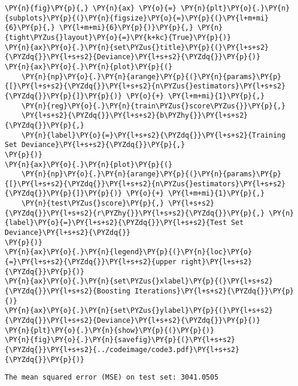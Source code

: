 \begin{Verbatim}[commandchars=\\\{\}]
\PY{n}{fig}\PY{p}{,} \PY{n}{ax} \PY{o}{=} \PY{n}{plt}\PY{o}{.}\PY{n}{subplots}\PY{p}{(}\PY{n}{figsize}\PY{o}{=}\PY{p}{(}\PY{l+m+mi}{6}\PY{p}{,} \PY{l+m+mi}{6}\PY{p}{)}\PY{p}{,} \PY{n}{tight\PYZus{}layout}\PY{o}{=}\PY{k+kc}{True}\PY{p}{)}
\PY{n}{ax}\PY{o}{.}\PY{n}{set\PYZus{}title}\PY{p}{(}\PY{l+s+s2}{\PYZdq{}}\PY{l+s+s2}{Deviance}\PY{l+s+s2}{\PYZdq{}}\PY{p}{)}
\PY{n}{ax}\PY{o}{.}\PY{n}{plot}\PY{p}{(}
    \PY{n}{np}\PY{o}{.}\PY{n}{arange}\PY{p}{(}\PY{n}{params}\PY{p}{[}\PY{l+s+s2}{\PYZdq{}}\PY{l+s+s2}{n\PYZus{}estimators}\PY{l+s+s2}{\PYZdq{}}\PY{p}{]}\PY{p}{)} \PY{o}{+} \PY{l+m+mi}{1}\PY{p}{,}
    \PY{n}{reg}\PY{o}{.}\PY{n}{train\PYZus{}score\PYZus{}}\PY{p}{,}
    \PY{l+s+s2}{\PYZdq{}}\PY{l+s+s2}{b\PYZhy{}}\PY{l+s+s2}{\PYZdq{}}\PY{p}{,}
    \PY{n}{label}\PY{o}{=}\PY{l+s+s2}{\PYZdq{}}\PY{l+s+s2}{Training Set Deviance}\PY{l+s+s2}{\PYZdq{}}\PY{p}{,}
\PY{p}{)}
\PY{n}{ax}\PY{o}{.}\PY{n}{plot}\PY{p}{(}
    \PY{n}{np}\PY{o}{.}\PY{n}{arange}\PY{p}{(}\PY{n}{params}\PY{p}{[}\PY{l+s+s2}{\PYZdq{}}\PY{l+s+s2}{n\PYZus{}estimators}\PY{l+s+s2}{\PYZdq{}}\PY{p}{]}\PY{p}{)} \PY{o}{+} \PY{l+m+mi}{1}\PY{p}{,} 
    \PY{n}{test\PYZus{}score}\PY{p}{,} \PY{l+s+s2}{\PYZdq{}}\PY{l+s+s2}{r\PYZhy{}}\PY{l+s+s2}{\PYZdq{}}\PY{p}{,} \PY{n}{label}\PY{o}{=}\PY{l+s+s2}{\PYZdq{}}\PY{l+s+s2}{Test Set Deviance}\PY{l+s+s2}{\PYZdq{}}
\PY{p}{)}
\PY{n}{ax}\PY{o}{.}\PY{n}{legend}\PY{p}{(}\PY{n}{loc}\PY{o}{=}\PY{l+s+s2}{\PYZdq{}}\PY{l+s+s2}{upper right}\PY{l+s+s2}{\PYZdq{}}\PY{p}{)}
\PY{n}{ax}\PY{o}{.}\PY{n}{set\PYZus{}xlabel}\PY{p}{(}\PY{l+s+s2}{\PYZdq{}}\PY{l+s+s2}{Boosting Iterations}\PY{l+s+s2}{\PYZdq{}}\PY{p}{)}
\PY{n}{ax}\PY{o}{.}\PY{n}{set\PYZus{}ylabel}\PY{p}{(}\PY{l+s+s2}{\PYZdq{}}\PY{l+s+s2}{Deviance}\PY{l+s+s2}{\PYZdq{}}\PY{p}{)}
\PY{n}{plt}\PY{o}{.}\PY{n}{show}\PY{p}{(}\PY{p}{)}
\PY{n}{fig}\PY{o}{.}\PY{n}{savefig}\PY{p}{(}\PY{l+s+s2}{\PYZdq{}}\PY{l+s+s2}{../codeimage/code3.pdf}\PY{l+s+s2}{\PYZdq{}}\PY{p}{)}
\end{Verbatim}

\begin{Verbatim}[commandchars=\\\{\}]
The mean squared error (MSE) on test set: 3041.0505
\end{Verbatim}